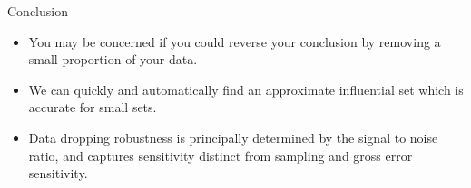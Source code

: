 




\begin{frame}{Conclusion}

\begin{itemize}
\item You may be concerned if you could reverse your conclusion by removing
a small proportion of your data.

\pause \item We can quickly and automatically find an approximate influential
set which is accurate for small sets.

\pause \item Data dropping robustness is principally determined by the
signal to noise ratio, and captures sensitivity distinct from sampling
and gross error sensitivity.

\end{itemize}

\end{frame}





